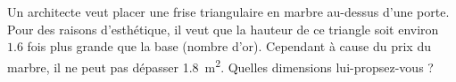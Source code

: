 
\begin{exercice}\label{exo2smath-0288}

    Un architecte veut placer une frise triangulaire en marbre au-dessus d'une porte. Pour des raisons d'esthétique, il veut que la hauteur de ce triangle soit environ \( 1.6\) fois plus grande que la base (nombre d'or). Cependant à cause du prix du marbre, il ne peut pas dépasser \SI{1.8}{\meter\squared}. Quelles dimensions lui-propsez-vous ?

\end{exercice}
